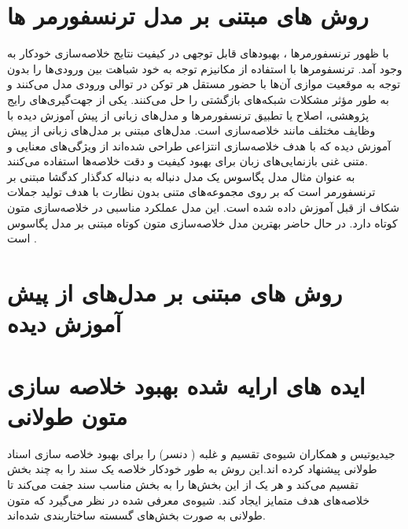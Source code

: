 \section{روش ‌های مبتنی بر مدل ترنسفورمر ها}
با ظهور ترنسفورمرها \cite{vaswani2017attention}، بهبودهای قابل توجهی در کیفیت نتایج خلاصه‌سازی خودکار به وجود آمد. ترنسفومرها با استفاده از مکانیزم توجه به خود‏
شباهت بین ورودی‌ها را بدون توجه به موقعیت موازی آن‌ها با حضور مستقل هر توکن در توالی ورودی مدل می‌کنند و به طور مؤثر مشکلات شبکه‌های بازگشتی را حل می‌کنند. یکی از جهت‌گیری‌های رایج پژوهشی، اصلاح یا تطبیق ترنسفورمرها و مدل‌های زبانی از پیش آموزش دیده با وظایف مختلف مانند خلاصه‌سازی است. مدل‌های مبتنی بر مدل‌های زبانی از پیش آموزش دیده که با هدف خلاصه‌سازی انتزاعی طراحی شده‌اند از ویژگی‌های معنایی و متنی غنی بازنمایی‌های زبان برای بهبود کیفیت و دقت خلاصه‌‌ها استفاده می‌کنند.
\\
به عنوان مثال مدل پگاسوس
\cite{zhang2020pegasus}
یک مدل دنباله به دنباله کدگذار کدگشا مبتنی بر ترنسفورمر است که بر روی مجموعه‌های متنی بدون نظارت با هدف تولید جملات شکاف
از قبل آموزش داده شده است. این مدل عملکرد مناسبی در خلاصه‌سازی متون کوتاه دارد. در حال حاضر بهترین مدل خلاصه‌سازی متون کوتاه مبتنی بر مدل پگاسوس است
\cite{sherborne2023meta}.

\section{روش های مبتنی بر مدل‌های از پیش آموزش دیده}




\section{ایده های  ارایه شده بهبود خلاصه سازی متون طولانی }


جیدیوتیس و همکاران  شیوه‌ی تقسیم و غلبه ( دنسر) 
را  برای بهبود خلاصه سازی اسناد طولانی پیشنهاد کرده اند.این روش به طور خودکار خلاصه یک سند را به چند بخش‌ تقسیم می‌کند و هر یک از این بخش‌ها را به بخش مناسب سند جفت می‌کند تا خلاصه‌های هدف متمایز ایجاد کند. شیوه‌ی معرفی شده در نظر می‌گیرد که متون طولانی به صورت بخش‌های گسسته ساختاربندی شده‌اند. 

